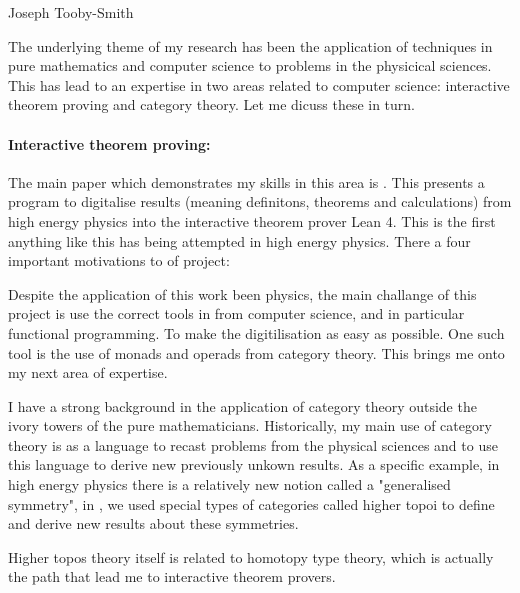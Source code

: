 \documentclass[14pt,letter]{article}
\newcounter{customtitle}
\begin{document}
\vspace{-1cm}
\begin{flushright}
{{\Large \color{white}Joseph Tooby-Smith }}
\end{flushright}
\vspace{0.4cm}
The underlying theme of my research has been 
the application of techniques in pure mathematics and computer science 
to problems in the physicical sciences. This has lead to an 
expertise in two areas related to computer science: 
interactive theorem proving and category theory.
Let me dicuss these in turn.

\paragraph{Interactive theorem proving:} The main paper which demonstrates my skills in this area 
is . This presents a program to digitalise results (meaning definitons, theorems and calculations)
from high energy physics into 
the interactive theorem prover Lean 4. This is the first anything like this has being attempted
in high energy physics. There a four important motivations to of project: 

Despite the application of this work been physics, the main challange of this project is 
use the correct tools in from computer science, and in particular functional programming.
To make the digitilisation as easy as possible. One such tool is the use of monads and operads
from category theory. This brings me onto my next area of expertise.

 I have a strong background in the application of category theory 
outside the ivory towers of the pure mathematicians. Historically, my main use of category theory 
is as a language to recast problems from the physical sciences and to use this language 
to derive new previously unkown results. As a specific example, in high energy physics 
there is a relatively new notion called a "generalised symmetry", in  , 
we used special types of categories called higher topoi to define and derive new results 
about these symmetries. 

Higher topos theory itself is related to homotopy type theory, which is actually 
the path that lead me to interactive theorem provers. 
\end{document}
